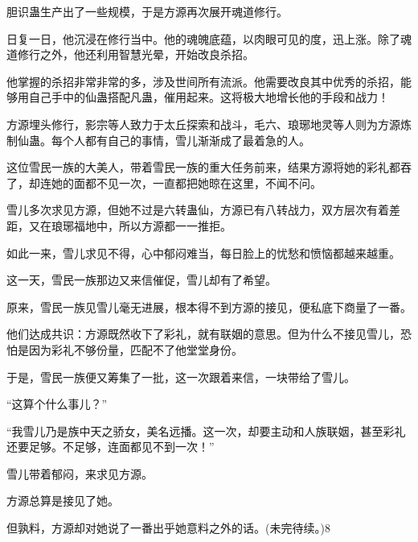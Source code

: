 \begin{this_body}
胆识蛊生产出了一些规模，于是方源再次展开魂道修行。

日复一日，他沉浸在修行当中。他的魂魄底蕴，以肉眼可见的度，迅上涨。除了魂道修行之外，他还利用智慧光晕，开始改良杀招。

他掌握的杀招非常非常的多，涉及世间所有流派。他需要改良其中优秀的杀招，能够用自己手中的仙蛊搭配凡蛊，催用起来。这将极大地增长他的手段和战力！

方源埋头修行，影宗等人致力于太丘探索和战斗，毛六、琅琊地灵等人则为方源炼制仙蛊。每个人都有自己的事情，雪儿渐渐成了最着急的人。

这位雪民一族的大美人，带着雪民一族的重大任务前来，结果方源将她的彩礼都吞了，却连她的面都不见一次，一直都把她晾在这里，不闻不问。

雪儿多次求见方源，但她不过是六转蛊仙，方源已有八转战力，双方层次有着差距，又在琅琊福地中，所以方源都一一推拒。

如此一来，雪儿求见不得，心中郁闷难当，每日脸上的忧愁和愤恼都越来越重。

这一天，雪民一族那边又来信催促，雪儿却有了希望。

原来，雪民一族见雪儿毫无进展，根本得不到方源的接见，便私底下商量了一番。

他们达成共识：方源既然收下了彩礼，就有联姻的意思。但为什么不接见雪儿，恐怕是因为彩礼不够份量，匹配不了他堂堂身份。

于是，雪民一族便又筹集了一批，这一次跟着来信，一块带给了雪儿。

“这算个什么事儿？”

“我雪儿乃是族中天之骄女，美名远播。这一次，却要主动和人族联姻，甚至彩礼还要足够。不足够，连面都见不到一次！”

雪儿带着郁闷，来求见方源。

方源总算是接见了她。

但孰料，方源却对她说了一番出乎她意料之外的话。(未完待续。)8

\end{this_body}

